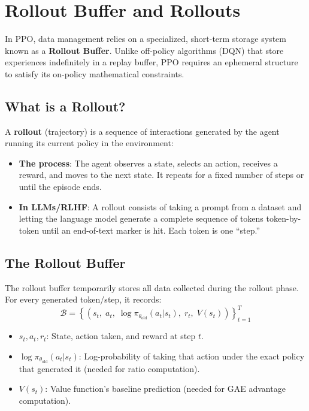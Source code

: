 \section{Rollout Buffer and Rollouts}
\label{rollout-buffer-and-rollouts}

In PPO, data management relies on a specialized, short-term storage system known as a \textbf{Rollout Buffer}. Unlike off-policy algorithms (DQN) that store experiences indefinitely in a replay buffer, PPO requires an ephemeral structure to satisfy its on-policy mathematical constraints.

\subsection{What is a Rollout?}
\label{what-is-a-rollout}

A \textbf{rollout} (trajectory) is a sequence of interactions generated by the agent running its current policy in the environment:

\begin{itemize}
  \item \textbf{The process}: The agent observes a state, selects an action, receives a reward, and moves to the next state. It repeats for a fixed number of steps or until the episode ends.
  \item \textbf{In LLMs/RLHF}: A rollout consists of taking a prompt from a dataset and letting the language model generate a complete sequence of tokens token-by-token until an end-of-text marker is hit. Each token is one ``step.''
\end{itemize}

\subsection{The Rollout Buffer}
\label{the-rollout-buffer}

The rollout buffer temporarily stores all data collected during the rollout phase. For every generated token/step, it records: 
\begin{equation}
\boxed{\mathcal{B} = \left\{ \left(s_t,\; a_t,\; \log\pi_{\theta_{\text{old}}}(a_t|s_t),\; r_t,\; V(s_t)\right) \right\}_{t=1}^{T}}
\end{equation}

\begin{itemize}
  \item $s_t, a_t, r_t$: State, action taken, and reward at step $t$.
  \item $\log\pi_{\theta_{\text{old}}}(a_t|s_t)$: Log-probability of taking that action under the exact policy that generated it (needed for ratio computation).
  \item $V(s_t)$: Value function’s baseline prediction (needed for GAE advantage computation).
\end{itemize}

